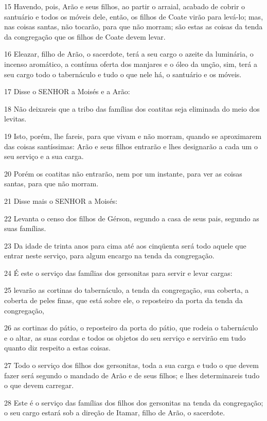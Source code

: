 \par 15 Havendo, pois, Arão e seus filhos, ao partir o arraial, acabado de cobrir o santuário e todos os móveis dele, então, os filhos de Coate virão para levá-lo; mas, nas coisas santas, não tocarão, para que não morram; são estas as coisas da tenda da congregação que os filhos de Coate devem levar.
\par 16 Eleazar, filho de Arão, o sacerdote, terá a seu cargo o azeite da luminária, o incenso aromático, a contínua oferta dos manjares e o óleo da unção, sim, terá a seu cargo todo o tabernáculo e tudo o que nele há, o santuário e os móveis.
\par 17 Disse o SENHOR a Moisés e a Arão:
\par 18 Não deixareis que a tribo das famílias dos coatitas seja eliminada do meio dos levitas.
\par 19 Isto, porém, lhe fareis, para que vivam e não morram, quando se aproximarem das coisas santíssimas: Arão e seus filhos entrarão e lhes designarão a cada um o seu serviço e a sua carga.
\par 20 Porém os coatitas não entrarão, nem por um instante, para ver as coisas santas, para que não morram.
\par 21 Disse mais o SENHOR a Moisés:
\par 22 Levanta o censo dos filhos de Gérson, segundo a casa de seus pais, segundo as suas famílias.
\par 23 Da idade de trinta anos para cima até aos cinqüenta será todo aquele que entrar neste serviço, para algum encargo na tenda da congregação.
\par 24 É este o serviço das famílias dos gersonitas para servir e levar cargas:
\par 25 levarão as cortinas do tabernáculo, a tenda da congregação, sua coberta, a coberta de peles finas, que está sobre ele, o reposteiro da porta da tenda da congregação,
\par 26 as cortinas do pátio, o reposteiro da porta do pátio, que rodeia o tabernáculo e o altar, as suas cordas e todos os objetos do seu serviço e servirão em tudo quanto diz respeito a estas coisas.
\par 27 Todo o serviço dos filhos dos gersonitas, toda a sua carga e tudo o que devem fazer será segundo o mandado de Arão e de seus filhos; e lhes determinareis tudo o que devem carregar.
\par 28 Este é o serviço das famílias dos filhos dos gersonitas na tenda da congregação; o seu cargo estará sob a direção de Itamar, filho de Arão, o sacerdote.
